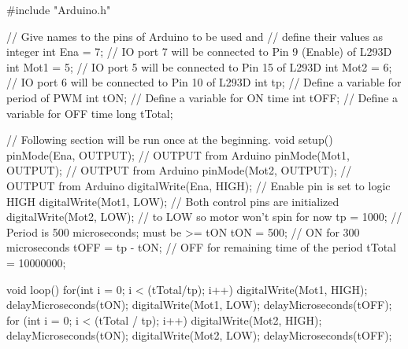 \documentclass[a4paper,12pt,oneside, tikz]{book}
\begin{document}
\begin{ino}
#include "Arduino.h"

// Give names to the pins of Arduino to be used and
// define their values as integer
int Ena = 7;  // IO port 7 will be connected to Pin 9 (Enable) of L293D
int Mot1 = 5; // IO port 5 will be connected to Pin 15 of L293D
int Mot2 = 6; // IO port 6 will be connected to Pin 10 of L293D
int tp;       // Define a variable for period of PWM
int tON;      // Define a variable for ON time
int tOFF;     // Define a variable for OFF time
long tTotal;

// Following section will be run once at the beginning.
void setup()
{
  pinMode(Ena, OUTPUT);    // OUTPUT from Arduino
  pinMode(Mot1, OUTPUT);   // OUTPUT from Arduino
  pinMode(Mot2, OUTPUT);   // OUTPUT from Arduino
  digitalWrite(Ena, HIGH); // Enable pin is set to logic HIGH
  digitalWrite(Mot1, LOW); // Both control pins are initialized
  digitalWrite(Mot2, LOW); // to LOW so motor won't spin for now
  tp = 1000;                // Period is 500 microseconds; must be >= tON
  tON = 500;               // ON for 300 microseconds
  tOFF = tp - tON;         // OFF for remaining time of the period
  tTotal = 10000000;
}

void loop()
{
  for(int i = 0; i < (tTotal/tp); i++) {
    digitalWrite(Mot1, HIGH);
    delayMicroseconds(tON);
    digitalWrite(Mot1, LOW);
    delayMicroseconds(tOFF);
  }
  for (int i = 0; i < (tTotal / tp); i++)
  {
    digitalWrite(Mot2, HIGH);
    delayMicroseconds(tON);
    digitalWrite(Mot2, LOW);
    delayMicroseconds(tOFF);
  }
}

\end{ino}
\end{document}
